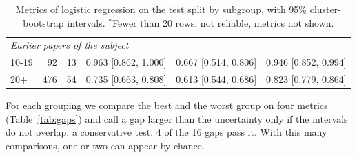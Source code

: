\documentclass[11pt,a4paper]{article}
\begin{document}
\begin{table}[!htb]
{\begin{tabular}{lrrccc}
\midrule
\multicolumn{6}{l}{\emph{Earlier papers of the subject}} \\
10-19 & 92 & 13 & 0.963 [0.862, 1.000] & 0.667 [0.514, 0.806] & 0.946 [0.852, 0.994] \\
20+ & 476 & 54 & 0.735 [0.663, 0.808] & 0.613 [0.544, 0.686] & 0.823 [0.779, 0.864] \\
\bottomrule
\end{tabular}}
\caption{Metrics of logistic regression on the test split by subgroup, with 95\% cluster-bootstrap intervals.
$^{*}$Fewer than 20 rows: not reliable, metrics not shown.}
\label{tab:bias}
\end{table}

For each grouping we compare the best and the worst group on four metrics (Table~\ref{tab:gaps}) and call a gap larger than the
uncertainty only if the intervals do not overlap, a conservative test. 4 of the 16 gaps pass it. With
this many comparisons, one or two can appear by chance.
\end{document}
